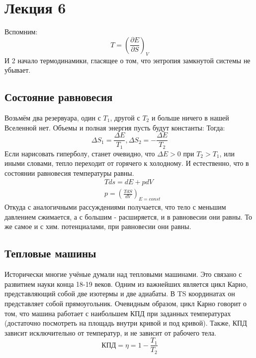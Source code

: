 \documentclass[a4paper, 12pt]{article}
\begin{document}
	\section{Лекция 6}
	Вспомним:
	\begin{equation*}
		T = (\frac{\partial E}{\partial S})_{V}
	\end{equation*}
	И 2 начало термодинамики, гласящее о том, что энтропия замкнутой системы не убывает.
	\subsection{Состояние равновесия}
	Возьмём два резервуара, один с $T_{1}$, другой с $T_{2}$ и больше ничего в нашей Вселенной нет. Объемы и полная энергия пусть будут константы: Тогда:
	\begin{equation*}
		\Delta S_{1} = \frac{\Delta E}{T_{1}}, \Delta S_{2} = - \frac{\Delta E}{T_{2}}
	\end{equation*}
	Если нарисовать гиперболу, станет очевидно, что $\Delta E > 0$ при $T_{2} > T_{1}$, или иными словами, тепло переходит от горячего к холодному. И естественно, что в состоянии равновесия температуры равны. 
	\begin{equation*}
		\begin{aligned}
			& Tds = dE+pdV                     \\
			& p =(\frac {TdS}{dV})_{E = const} 
		\end{aligned}
	\end{equation*}
	Откуда с аналогичными рассуждениями получается, что тело с меньшим давлением сжимается, а с большим - расширяется, и в равновесии они равны. То же самое и с хим. потенциалами, при равновесии они равны. 
	\subsection{Тепловые машины}
	Исторически многие учёные думали над тепловыми машинами. Это связано с развитием науки конца 18-19 веков. Одним из важнейших является цикл Карно, представляющий собой две изотермы и две адиабаты. В TS координатах он представляет собой прямоугольник. Очевидным образом, цикл Карно говорит о том, что машина работает с наибольшем КПД при заданных температурах (достаточно посмотреть на площадь внутри кривой и под кривой). Также, КПД зависит исключительно от температур, и не зависит от рабочего тела. 
	\begin{equation*}
		\text{КПД}=\eta=1 - \frac{T_{1}}{T_{2}}
	\end{equation*}
	
\end{document}

